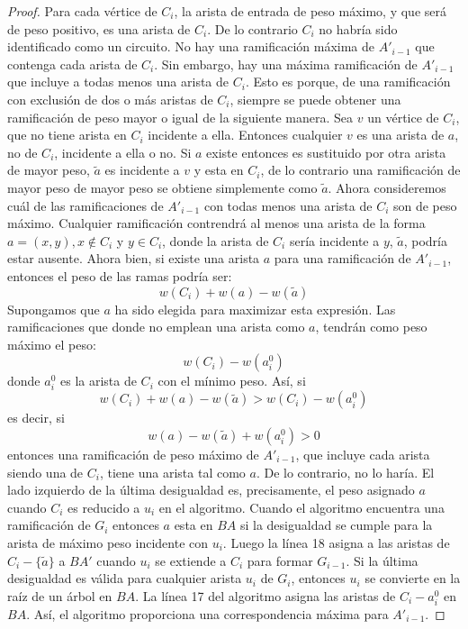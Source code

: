 \documentclass[10pt,a5paper]{book}
\begin{document}
\begin{proof}
Para cada vértice de $C_i$, la arista de entrada de peso máximo, y que será de peso positivo, es una arista de $C_i$. De lo contrario $C_i$ no habría sido identificado como un circuito. No hay una ramificación máxima de $A'_{i-1}$ que contenga cada arista de $C_i$. Sin embargo, hay una máxima ramificación de $A'_{i-1}$ que incluye a todas menos una arista de $C_i$. Esto es porque, de una ramificación con exclusión de dos o más aristas de $C_i$, siempre se puede obtener una ramificación de peso mayor o igual de la siguiente manera. Sea $v$ un vértice de $C_i$, que no tiene arista en $C_i$ incidente a ella. Entonces cualquier $v$ es una arista de $a$, no de $C_i$, incidente a ella o no. Si $a$ existe entonces es sustituido por otra arista de mayor peso, $\tilde{a}$ es incidente a $v$ y esta en $C_i$, de lo contrario una ramificación de mayor peso de mayor peso se obtiene simplemente como $\tilde{a}$. Ahora consideremos cuál de las ramificaciones de $A'_{i-1}$ con todas menos una arista de $C_i$ son de peso máximo. Cualquier ramificación contrendrá al menos una arista de la forma $a = (x,y), x \notin C_i$ y $y \in C_i$, donde la arista de $C_i$ sería incidente a $y$, $\tilde{a}$, podría estar ausente. Ahora bien, si existe una arista $a$ para una ramificación de $A'_{i-1}$, entonces el peso de las ramas podría ser:
\[w(C_i) + w(a) - w(\tilde{a})\]
Supongamos que $a$ ha sido elegida para maximizar esta expresión. Las ramificaciones que donde no emplean una arista como $a$, tendrán como peso máximo el peso:
\[w(C_i) - w(a_i^0)\]
donde $a_i^0$ es la arista de $C_i$ con el mínimo peso. Así, si
\[w(C_i) + w(a) - w(\tilde{a}) > w(C_i) - w(a_i^0)\]
es decir, si
\[w(a) - w(\tilde{a}) + w(a_i^0) > 0\]
entonces una ramificación de peso máximo de $A'_{i-1}$, que incluye cada arista siendo una de $C_i$, tiene una arista tal como $a$. De lo contrario, no lo haría. El lado izquierdo de la última desigualdad es, precisamente, el peso asignado $a$ cuando $C_i$ es reducido a $u_i$ en el algoritmo. Cuando el algoritmo encuentra una ramificación de $G_i$ entonces $a$ esta en $BA$ si la desigualdad se cumple para la arista de máximo peso incidente con $u_i$. Luego la línea 18 asigna a las aristas de $C_i - \{\tilde{a}\}$ a $BA'$ cuando $u_i$ se extiende a $C_i$ para formar $G_{i-1}$. Si la última desigualdad es válida para cualquier arista $u_i$ de $G_i$, entonces $u_i$ se convierte en la raíz de un árbol en $BA$. La línea 17 del algoritmo asigna las aristas de $C_i - a_i^0$ en $BA$. Así, el algoritmo proporciona una correspondencia máxima para $A'_{i-1}$.


\end{proof}
\end{document}
